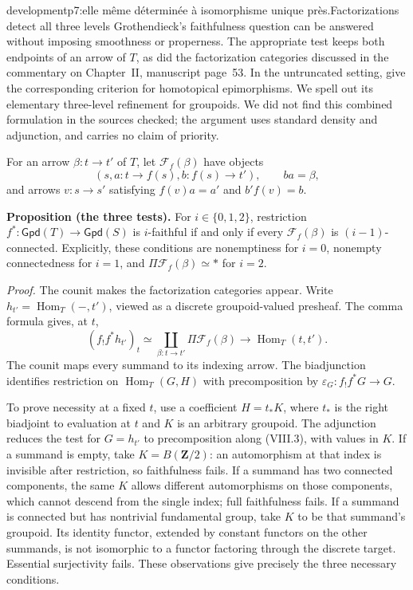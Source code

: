 \begin{dcomment}{development}{p7:elle même déterminée à isomorphisme unique près.}{Factorizations detect all three levels}
Grothendieck's faithfulness question can be answered without imposing smoothness or properness. The appropriate test keeps both endpoints of an arrow of $T$, as did the factorization categories discussed in the commentary on Chapter~II, manuscript page~53. In the untruncated setting, \citet[arXiv version, Definition~6.9 and Theorem~6.10]{GrothStovicek2016Trees} give the corresponding criterion for homotopical epimorphisms. We spell out its elementary three-level refinement for groupoids. We did not find this combined formulation in the sources checked; the argument uses standard density and adjunction, and carries no claim of priority.

For an arrow $\beta:t\to t'$ of $T$, let $\mathcal F_f(\beta)$ have objects
\[
 (s,a:t\to f(s),b:f(s)\to t'),\qquad ba=\beta,
\]
and arrows $v:s\to s'$ satisfying $f(v)a=a'$ and $b'f(v)=b$.

\textbf{Proposition (the three tests).}\ours\quad
For $i\in\{0,1,2\}$, restriction $f^*:\mathsf{Gpd}(T)\to\mathsf{Gpd}(S)$ is $i$-faithful if and only if every $\mathcal F_f(\beta)$ is $(i-1)$-connected. Explicitly, these conditions are nonemptiness for $i=0$, nonempty connectedness for $i=1$, and $\Pi\mathcal F_f(\beta)\simeq*$ for $i=2$.

\emph{Proof.} The counit makes the factorization categories appear. Write $h_{t'}=\operatorname{Hom}_T(-,t')$, viewed as a discrete groupoid-valued presheaf. The comma formula gives, at $t$,
\[
 (f_!f^*h_{t'})_t
 \simeq\coprod_{\beta:t\to t'}\Pi\mathcal F_f(\beta)
 \longrightarrow \operatorname{Hom}_T(t,t').
 \tag{VIII.3}
\]
The counit maps every summand to its indexing arrow. The biadjunction identifies restriction on $\operatorname{Hom}_T(G,H)$ with precomposition by $\varepsilon_G:f_!f^*G\to G$.

To prove necessity at a fixed $t$, use a coefficient $H=t_*K$, where $t_*$ is the right biadjoint to evaluation at $t$ and $K$ is an arbitrary groupoid. The adjunction reduces the test for $G=h_{t'}$ to precomposition along (VIII.3), with values in $K$. If a summand is empty, take $K=B(\mathbf Z/2)$: an automorphism at that index is invisible after restriction, so faithfulness fails. If a summand has two connected components, the same $K$ allows different automorphisms on those components, which cannot descend from the single index; full faithfulness fails. If a summand is connected but has nontrivial fundamental group, take $K$ to be that summand's groupoid. Its identity functor, extended by constant functors on the other summands, is not isomorphic to a functor factoring through the discrete target. Essential surjectivity fails. These observations give precisely the three necessary conditions.


\end{dcomment}
